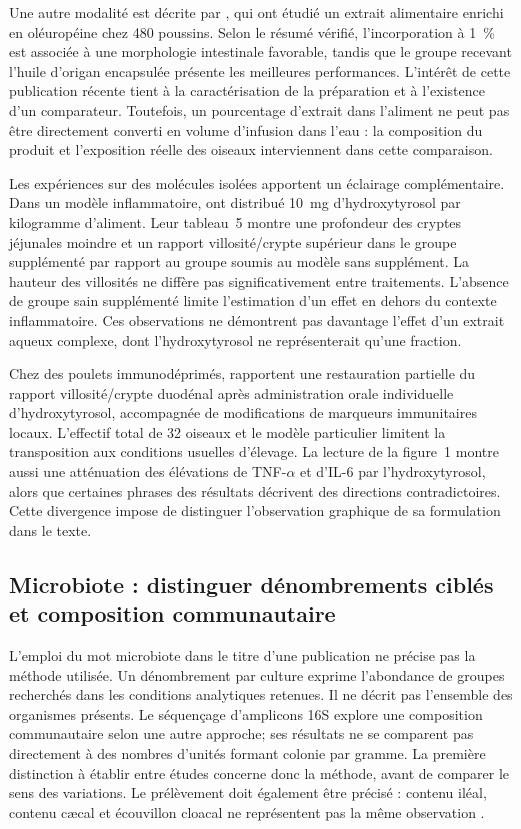Une autre modalité est décrite par \citet{Vasilopoulou2026}, qui ont étudié un extrait alimentaire enrichi en oléuropéine chez 480 poussins. Selon le résumé vérifié, l'incorporation à 1~\% est associée à une morphologie intestinale favorable, tandis que le groupe recevant l'huile d'origan encapsulée présente les meilleures performances. L'intérêt de cette publication récente tient à la caractérisation de la préparation et à l'existence d'un comparateur. Toutefois, un pourcentage d'extrait dans l'aliment ne peut pas être directement converti en volume d'infusion dans l'eau : la composition du produit et l'exposition réelle des oiseaux interviennent dans cette comparaison.

Les expériences sur des molécules isolées apportent un éclairage complémentaire. Dans un modèle inflammatoire, \citet{Dias2024} ont distribué 10~mg d'hydroxytyrosol par kilogramme d'aliment. Leur tableau~5 montre une profondeur des cryptes jéjunales moindre et un rapport villosité/crypte supérieur dans le groupe supplémenté par rapport au groupe soumis au modèle sans supplément. La hauteur des villosités ne diffère pas significativement entre traitements. L'absence de groupe sain supplémenté limite l'estimation d'un effet en dehors du contexte inflammatoire. Ces observations ne démontrent pas davantage l'effet d'un extrait aqueux complexe, dont l'hydroxytyrosol ne représenterait qu'une fraction.

Chez des poulets immunodéprimés, \citet{Shan2022} rapportent une restauration partielle du rapport villosité/crypte duodénal après administration orale individuelle d'hydroxytyrosol, accompagnée de modifications de marqueurs immunitaires locaux. L'effectif total de 32 oiseaux et le modèle particulier limitent la transposition aux conditions usuelles d'élevage. La lecture de la figure~1 montre aussi une atténuation des élévations de TNF-$\alpha$ et d'IL-6 par l'hydroxytyrosol, alors que certaines phrases des résultats décrivent des directions contradictoires. Cette divergence impose de distinguer l'observation graphique de sa formulation dans le texte.

\subsection{Microbiote : distinguer dénombrements ciblés et composition communautaire}

L'emploi du mot microbiote dans le titre d'une publication ne précise pas la méthode utilisée. Un dénombrement par culture exprime l'abondance de groupes recherchés dans les conditions analytiques retenues. Il ne décrit pas l'ensemble des organismes présents. Le séquençage d'amplicons 16S explore une composition communautaire selon une autre approche; ses résultats ne se comparent pas directement à des nombres d'unités formant colonie par gramme. La première distinction à établir entre études concerne donc la méthode, avant de comparer le sens des variations. Le prélèvement doit également être précisé : contenu iléal, contenu cæcal et écouvillon cloacal ne représentent pas la même observation \citep{Amini2019,Negm2025,Balzan2021}.

